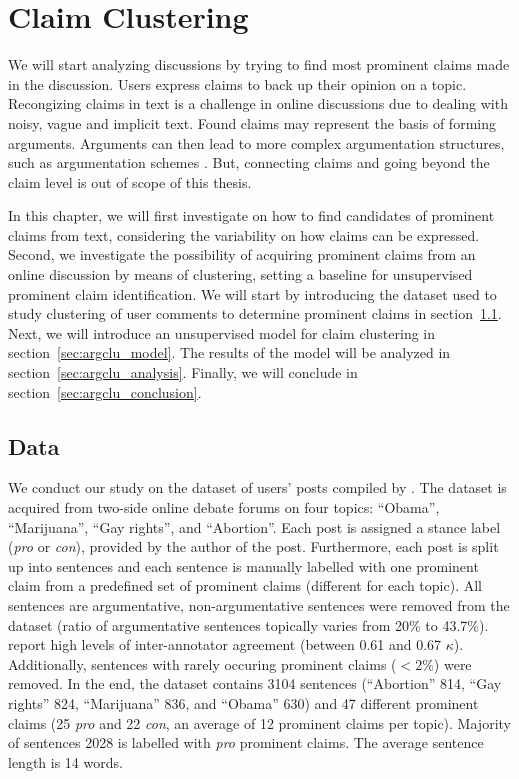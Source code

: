 \chapter{Claim Clustering}
\label{chap:argclu}


We will start analyzing discussions by trying to find most prominent 
claims made in the discussion.
Users express claims to back up their opinion on a topic. 
Recongizing claims in text is a challenge in online discussions due to 
dealing with noisy, vague and implicit text. 
Found claims may represent the basis of
forming arguments. Arguments can then lead to more complex 
argumentation structures, such as argumentation schemes \citep{walton2008argumentation}. 
But, connecting claims and going beyond the claim level is
out of scope of this thesis. 

In this chapter, we will first investigate on how to find candidates of 
prominent claims from text, considering the variability on how 
claims can be expressed. Second, we investigate the possibility of 
acquiring prominent claims from an online discussion by means of clustering, 
setting a baseline for unsupervised prominent claim identification. 
We will start by introducing the dataset used to study clustering of
user comments to determine prominent claims in section~\ref{sec:argclu_data}.
Next, we will introduce an unsupervised
model for claim clustering in section~\ref{sec:argclu_model}.
The results of the model will be analyzed in section~\ref{sec:argclu_analysis}.
Finally, we will conclude in section~\ref{sec:argclu_conclusion}. 

\section{Data}
\label{sec:argclu_data}

We conduct our study on the dataset of users' posts compiled by \citet{hasan2014you}. 
The dataset is acquired from two-side online debate forums on four topics: 
``Obama'', ``Marijuana'', ``Gay rights'', and ``Abortion''.
Each post is assigned a stance label (\textit{pro} or \textit{con}), provided
by the author of the post. 
Furthermore, each post is split up into sentences and each sentence is manually labelled
with one prominent claim from a predefined set of prominent claims 
(different for each topic). 
All sentences are argumentative, non-argumentative sentences were removed from the 
dataset (ratio of argumentative sentences topically varies from  20\% to 43.7\%). 
\citet{hasan2014you} report high levels of inter-annotator agreement (between
0.61 and 0.67 $\kappa$). 
Additionally, sentences with rarely occuring prominent claims ($<2\%$) were removed. 
In the end, the dataset contains 3104 sentences (``Abortion'' 814, ``Gay rights'' 824, 
``Marijuana'' 836, and ``Obama'' 630) and 47 different prominent claims
(25 \textit{pro} and 22 \textit{con}, an average of 12 prominent claims per topic). 
Majority of sentences 2028 is labelled with \textit{pro} prominent claims. 
The average sentence length is 14 words. 

